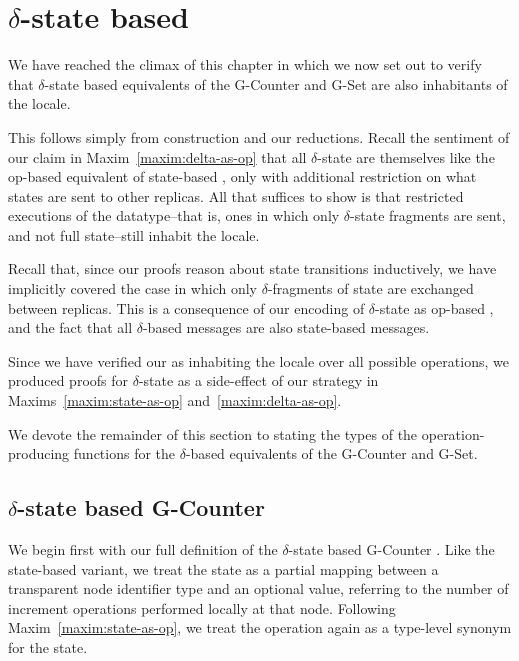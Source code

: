 \section{$\delta$-state based \CRDTs}
\label{sec:isabelle-delta-crdts}

We have reached the climax of this chapter in which we now set out to verify
that $\delta$-state based \CRDT equivalents of the G-Counter and G-Set are also
inhabitants of the \SEC locale.

This follows simply from construction and our reductions. Recall the sentiment
of our claim in Maxim~\ref{maxim:delta-as-op} that all $\delta$-state \CRDTs are
themselves like the op-based equivalent of state-based \CRDTs, only with
additional restriction on what states are sent to other replicas. All that
suffices to show is that restricted executions of the datatype--that is, ones in
which only $\delta$-state fragments are sent, and not full state--still inhabit
the \SEC locale.

Recall that, since our proofs reason about state transitions inductively, we
have implicitly covered the case in which only $\delta$-fragments of state are
exchanged between replicas. This is a consequence of our encoding of
$\delta$-state \CRDTs as op-based \CRDTs, and the fact that all $\delta$-based
\CRDT messages are also state-based \CRDT messages.

Since we have verified our \CRDTs as inhabiting the \SEC locale over all
possible operations, we produced proofs for $\delta$-state \CRDTs as a
side-effect of our strategy in Maxims~\ref{maxim:state-as-op}
and~\ref{maxim:delta-as-op}.

We devote the remainder of this section to stating the types of the
operation-producing functions for the $\delta$-based \CRDT equivalents of the
G-Counter and G-Set.

\subsection{$\delta$-state based G-Counter}
\label{sec:isabelle-delta-gcounter}

We begin first with our full definition of the $\delta$-state based G-Counter
\CRDT. Like the state-based variant, we treat the state as a partial mapping
between a transparent node identifier type and an optional value, referring to
the number of increment operations performed locally at that node. Following
Maxim~\ref{maxim:state-as-op}, we treat the operation again as a type-level
synonym for the state.

